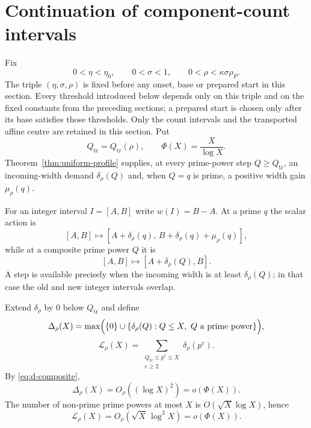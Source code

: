 \section{Continuation of component-count intervals}
\label{sec:scalar-finality}

Fix
\[
0<\eta<\eta_0,
\qquad
0<\sigma<1,
\qquad
0<\rho<\kappa\sigma\rho_P.
\]
The triple $(\eta,\sigma,\rho)$ is fixed before any onset, base or prepared start in this section.  Every threshold introduced below depends only on this triple and on the fixed constants from the preceding sections; a prepared start is chosen only after its base satisfies those thresholds.
Only the count intervals and the transported affine centre are retained in this section.  Put
\[
Q_{\mathrm{tr}}=Q_{\mathrm{tr}}(\rho),
\qquad
\Phi(X)=\frac X{\log X}.
\]
Theorem~\ref{thm:uniform-profile} supplies, at every prime-power step $Q\ge Q_{\mathrm{tr}}$, an incoming-width demand $\delta_\rho(Q)$ and, when $Q=q$ is prime, a positive width gain $\mu_\rho(q)$.

For an integer interval $I=[A,B]$ write $w(I)=B-A$.  At a prime $q$ the scalar action is
\begin{equation}\label{eq:prime-action}
[A,B]\longmapsto
[A+\delta_\rho(q),\,B+\delta_\rho(q)+\mu_\rho(q)],
\end{equation}
while at a composite prime power $Q$ it is
\begin{equation}\label{eq:composite-action}
[A,B]\longmapsto[A+\delta_\rho(Q),B].
\end{equation}
A step is available precisely when the incoming width is at least $\delta_\rho(Q)$; in that case the old and new integer intervals overlap.

Extend $\delta_\rho$ by $0$ below $Q_{\mathrm{tr}}$ and define
\[
\Delta_\rho(X)=
\max\Bigl(\{0\}\cup\{\delta_\rho(Q):Q\le X,\ Q\text{ a prime power}\}\Bigr),
\]
\begin{equation}\label{eq:cumulative-loss}
\mathcal L_\rho(X)=
\sum_{\substack{Q_{\mathrm{tr}}\le p^e\le X\\e\ge2}}
\delta_\rho(p^e).
\end{equation}
By \eqref{eq:d-composite},
\begin{equation}\label{eq:max-demand-subscale}
\Delta_\rho(X)=O_\rho((\log X)^2)=o(\Phi(X)).
\end{equation}
The number of non-prime prime powers at most $X$ is $O(\sqrt X\log X)$, hence
\begin{equation}\label{eq:loss-subscale}
\mathcal L_\rho(X)=O_\rho(\sqrt X\,\log^3X)=o(\Phi(X)).
\end{equation}

